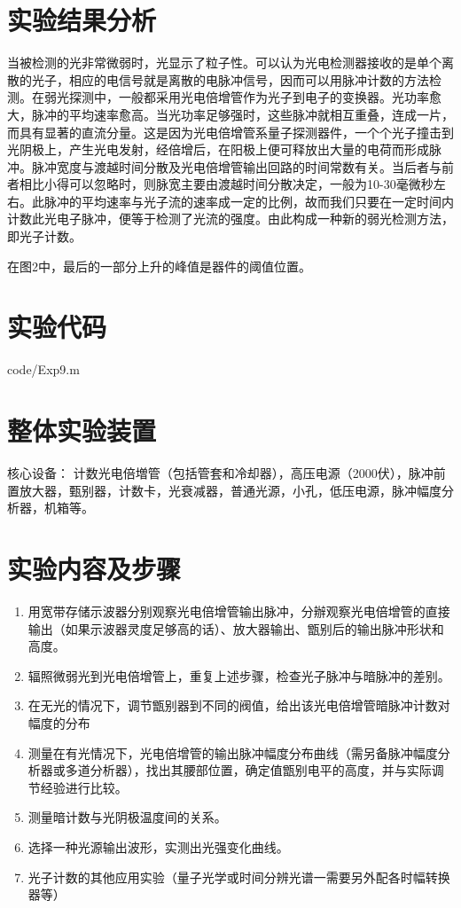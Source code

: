 \documentclass[UTF8]{ctexart}
\makeatletter
\newcommand{\figcaption}{\def\@captype{figure}\caption}
\makeatother
\begin{document}
\begin{center}
	\figcaption{电压与计数分布(在更小范围内)}\label{voltagesub}
\end{center}
\section{实验结果分析}
 当被检测的光非常微弱时，光显示了粒子性。可以认为光电检测器接收的是单个离散的光子，相应的电信号就是离散的电脉冲信号，因而可以用脉冲计数的方法检测。在弱光探测中，一般都采用光电倍增管作为光子到电子的变换器。光功率愈大，脉冲的平均速率愈高。当光功率足够强时，这些脉冲就相互重叠，连成一片，而具有显著的直流分量。这是因为光电倍增管系量子探测器件，一个个光子撞击到光阴极上，产生光电发射，经倍增后，在阳极上便可释放出大量的电荷而形成脉冲。脉冲宽度与渡越时间分散及光电倍增管输出回路的时间常数有关。当后者与前者相比小得可以忽略时，则脉宽主要由渡越时间分散决定，一般为10-30毫微秒左右。此脉冲的平均速率与光子流的速率成一定的比例，故而我们只要在一定时间内计数此光电子脉冲，便等于检测了光流的强度。由此构成一种新的弱光检测方法，即光子计数。
 
 在图2中，最后的一部分上升的峰值是器件的阈值位置。
 \section{实验代码}
 	
 {code/Exp9.m}
\section{整体实验装置}
核心设备：
计数光电倍増管（包括管套和冷却器），高压电源（2000伏），脉冲前置放大器，甄别器，计数卡，光衰减器，普通光源，小孔，低压电源，脉冲幅度分析器，机箱等。

\section{实验内容及步骤}
\begin{enumerate}
	\item 用宽带存储示波器分别观察光电倍增管输出脉冲，分辦观察光电倍增管的直接输出（如果示波器灵度足够高的话）、放大器输出、甑别后的输出脉冲形状和高度。
	\item 辐照微弱光到光电倍增管上，重复上述步骤，检查光子脉冲与暗脉冲的差别。
	\item 在无光的情况下，调节甑别器到不同的阀值，给出该光电倍增管暗脉冲计数对幅度的分布
	\item 测量在有光情况下，光电倍增管的输出脉冲幅度分布曲线（需另备脉冲幅度分析器或多道分析器），找出其腰部位置，确定值甑别电平的高度，并与实际调节经验进行比较。
	\item 测量暗计数与光阴极温度间的关系。
	\item 选择一种光源输出波形，实测出光强变化曲线。
	\item 光子计数的其他应用实验（量子光学或时间分辨光谱一需要另外配各时幅转换器等）
\end{enumerate}
\end{document}
